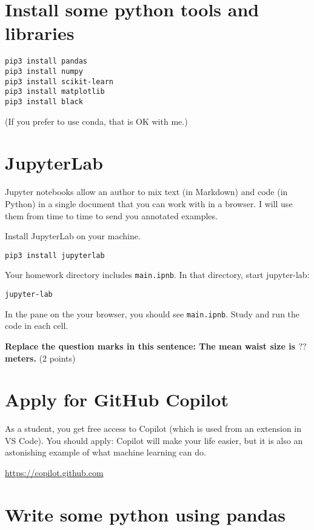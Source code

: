 \documentclass[11pt,english]{article}
\begin{document}
\section{Install some python tools and libraries}

\begin{Verbatim}
pip3 install pandas
pip3 install numpy
pip3 install scikit-learn
pip3 install matplotlib
pip3 install black
\end{Verbatim}

(If you prefer to use conda,  that is OK with me.)

\section{JupyterLab}

Jupyter notebooks allow an author to mix text (in Markdown) and code (in Python)
in a single document that you can work with in a browser.   I will use them from time to 
time to send you annotated examples.

Install JupyterLab on your machine.

\begin{Verbatim}
pip3 install jupyterlab
\end{Verbatim}

Your homework directory includes  \texttt{main.ipnb}. In that directory,  start jupyter-lab:
\begin{Verbatim}
jupyter-lab
\end{Verbatim}

In the pane on the  your browser,  you should see \texttt{main.ipnb}.   Study and run the code in each cell.

\textbf{Replace the question marks in this sentence: The mean waist size is $??$ meters.} (2 points)

\section{Apply for GitHub Copilot}

As a student,  you get free access to Copilot (which is used from an extension in VS Code).  
You should apply: Copilot will make your life easier,  but it is also an astonishing example of what machine learning can do.

\url{https://copilot.github.com}

\section{Write some python using pandas}
\end{document}
